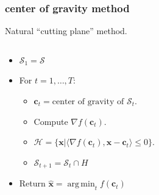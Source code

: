 \documentclass[compress]{beamer}
\newcommand{\bv}[1]{\mathbf{#1}}
\DeclareMathOperator*{\argmin}{arg\,min}
\begin{document}
\begin{frame}[t]
\begin{columns}
\begin{column}{.35\textwidth}
\end{column}
\end{columns}
\end{frame}

\begin{frame}[t]
	\frametitle{center of gravity method}
	\begin{center}
		Natural ``cutting plane'' method.
	\end{center}
	\begin{columns}
		\begin{column}{.6\textwidth}
			\begin{itemize}
				\item $\mathcal{S}_1 = \mathcal{S}$
				\item For $t = 1, \ldots, T:$
				\begin{itemize}
					\item $\bv{c}_t = \text{center of gravity of } \mathcal{S}_t$.
					\item \alert{Compute $\nabla f(\bv{c}_t)$.}
					\item $\mathcal{H} = \{\bv{x} \big\vert \langle \nabla f(\bv{c}_t), \bv{x}-\bv{c}_t\rangle \leq 0\}$.
					\item $\mathcal{S}_{t+1} = \mathcal{S}_{t} \cap H$
				\end{itemize}
				\item Return $\hat{\mathbf{x}} = \argmin_t f(\bv{c}_t)$
			\end{itemize}
		\end{column}
		\begin{column}{.35\textwidth}

\end{column}
\end{columns}
\end{frame}
\end{document}
